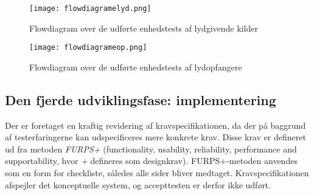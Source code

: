 \begin{figure}[htb]
\centering
\texttt{[image: flowdiagramelyd.png]}
\caption{Flowdiagram over de udførte enhedstests af lydgivende kilder}
\label{fig:flowlyd}
\end{figure}

\begin{figure}[htb]
\centering
\texttt{[image: flowdiagrameop.png]}
\caption{Flowdiagram over de udførte enhedstests af lydopfangere}	
\label{fig:flowop}
\end{figure}


\subsection{Den fjerde udviklingsfase: implementering}

Der er foretaget en kraftig revidering af kravspecifikationen, da der på baggrund af testerfaringerne kan udspecificeres mere konkrete krav. Disse krav er defineret ud fra metoden \textit{FURPS+} (functionality, usability, reliability, performance and supportability, hvor \textit{+} defineres som designkrav). FURPS+-metoden anvendes som en form for checkliste, således alle sider bliver medtaget. Kravspecifikationen afspejler det konceptuelle system, og accepttesten er derfor ikke udført.  

 